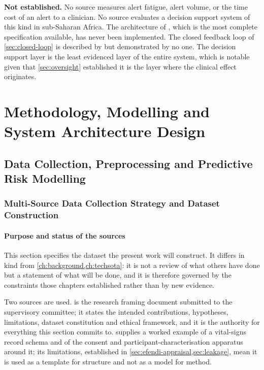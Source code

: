 \documentclass[12pt,a4paper,oneside]{report}
\begin{document}
\textbf{Not established.} No source measures alert fatigue, alert volume, or the time cost of an alert to a clinician. No source evaluates a decision support system of this kind in sub-Saharan Africa. The architecture of \textcite{yazdani2018}, which is the most complete specification available, has never been implemented. The closed feedback loop of \cref{sec:closed-loop} is described by \textcite{liu2025review} but demonstrated by no one. The decision support layer is the least evidenced layer of the entire system, which is notable given that \cref{sec:oversight} established it is the layer where the clinical effect originates.

\part{Methodology, Modelling and System Architecture Design}

\chapter{Data Collection, Preprocessing and Predictive Risk Modelling}\label{ch:data}

\section{Multi-Source Data Collection Strategy and Dataset Construction}\label{sec:collection}

\subsection*{Purpose and status of the sources}

This section specifies the dataset the present work will construct. It differs in kind from \cref{ch:background,ch:techsota}: it is not a review of what others have done but a statement of what will be done, and it is therefore governed by the constraints those chapters established rather than by new evidence.

Two sources are used. \Textcite{cadrage2026} is the research framing document submitted to the supervisory committee; it states the intended contributions, hypotheses, limitations, dataset constitution and ethical framework, and it is the authority for everything this section commits to. \Textcite{efendi2025} supplies a worked example of a vital-signs record schema and of the consent and participant-characterisation apparatus around it; its limitations, established in \cref{sec:efendi-appraisal,sec:leakage}, mean it is used as a template for structure and not as a model for method.
\end{document}

